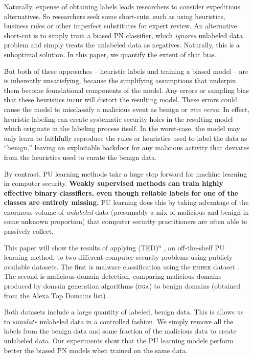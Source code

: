 \documentclass[conference]{IEEEtran}
\begin{document}
    Naturally, expense of obtaining labels leads researchers to consider expeditious alternatives. So researchers seek some short-cuts, such as using heuristics, business rules or other imperfect substitutes for expert review. An alternative short-cut is to simply train a biased PN classifier, which \textit{ignores} unlabeled data problem and simply treats the unlabeled data as negatives. Naturally, this is a suboptimal solution. In this paper, we quantify the extent of that bias.

    But both of these approaches -- heuristic labels and training a biased model -- are is inherently unsatisfying, because the simplifying assumptions that underpin them become foundational components of the model. Any errors or sampling bias that these heuristics incur will distort the resulting model. These errors could cause the model to misclassify a malicious event as benign or \textit{vice versa}. In effect, heuristic labeling can create systematic security holes in the resulting model which originate in the labeling process itself. In the worst-case, the model may only learn to faithfully reproduce the rules or heuristics used to label the data as ``benign,'' leaving an exploitable backdoor for any malicious activity that deviates from the heuristics used to curate the benign data.

    By contrast, PU learning methods take a huge step forward for machine learning in computer security. \textbf{Weakly supervised methods can train highly effective binary classifiers, even though reliable labels for one of the classes are entirely missing.} PU learning does this by taking advantage of the enormous volume of \textit{unlabeled} data (presumably a mix of malicious and benign in some unknown proportion) that computer security practitioners are often able to passively collect.

    This paper will show the results of applying (TED)${}^n$ \cite{garg-2021}, an off-the-shelf PU learning method, to two different computer security problems using publicly available datasets. The first is malware classification using the \textsc{ember} dataset \cite{anderson-2018}. The second is malicious domain detection, comparing malicious domains produced by domain generation algorithms (\textsc{dga}) to benign domains (obtained from the Alexa Top Domains list) \cite{namgung-2021}.

    Both datasets include a large quantity of labeled, benign data. This is allows us to \textit{simulate} unlabeled data in a controlled fashion. We simply remove all the labels from the benign data and some fraction of the malicious data to create unlabeled data. Our experiments show that the PU learning models perform better the biased PN models when trained on the same data.
\end{document}
